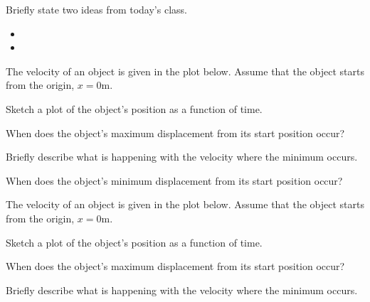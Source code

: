 \begin{problem}
\item Briefly state two ideas from today's class.
  \begin{itemize}
  \item 
  \item 
  \end{itemize}
\item The velocity of an object is given in the plot below. Assume
  that the object starts from the origin, $x=0$m. \\
  \scalebox{0.7}{}
  \begin{subproblem}
  \item Sketch a plot of the object's position as a function of time.
  \item When does the object's maximum displacement from its start
    position occur?
    \vspace{3em}
  \item Briefly describe what is happening with the velocity where the
    minimum occurs.
    \vfill
  \item When does the object's minimum displacement from its start
    position occur?
    \vspace{3em}
  \end{subproblem}

  \clearpage

\item The velocity of an object is given in the plot below. Assume
  that the object starts from the origin, $x=0$m.

  \scalebox{0.7}{}

  \begin{subproblem}
  \item Sketch a plot of the object's position as a function of time.
  \item When does the object's maximum displacement from its start
    position occur?
    \vspace{3em}
  \item Briefly describe what is happening with the velocity where the
    minimum occurs.
    \vfill
  \end{subproblem}

\clearpage


\end{problem}
